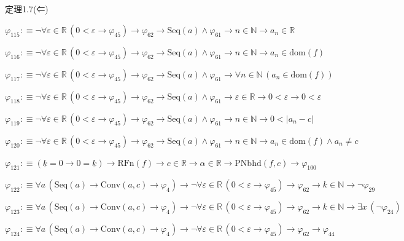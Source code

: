 \begin{fullproof}{定理1.7(⇐)}
\begin{abbrevlist}
\item $\varphi_{115} :\equiv \neg \forall \varepsilon \in \mathbb{R}\,(0 < \varepsilon \to \varphi_{45}) \to \varphi_{62} \to \mathrm{Seq}(a) \land \varphi_{61} \to n \in \mathbb{N} \to a_{n} \in \mathbb{R}$
\item $\varphi_{116} :\equiv \neg \forall \varepsilon \in \mathbb{R}\,(0 < \varepsilon \to \varphi_{45}) \to \varphi_{62} \to \mathrm{Seq}(a) \land \varphi_{61} \to n \in \mathbb{N} \to a_{n} \in \mathrm{dom}(f)$
\item $\varphi_{117} :\equiv \neg \forall \varepsilon \in \mathbb{R}\,(0 < \varepsilon \to \varphi_{45}) \to \varphi_{62} \to \mathrm{Seq}(a) \land \varphi_{61} \to \forall n \in \mathbb{N}\,(a_{n} \in \mathrm{dom}(f))$
\item $\varphi_{118} :\equiv \neg \forall \varepsilon \in \mathbb{R}\,(0 < \varepsilon \to \varphi_{45}) \to \varphi_{62} \to \mathrm{Seq}(a) \land \varphi_{61} \to \varepsilon \in \mathbb{R} \to 0 < \varepsilon \to 0 < \varepsilon$
\item $\varphi_{119} :\equiv \neg \forall \varepsilon \in \mathbb{R}\,(0 < \varepsilon \to \varphi_{45}) \to \varphi_{62} \to \mathrm{Seq}(a) \land \varphi_{61} \to n \in \mathbb{N} \to 0 < \lvert a_{n} - c \rvert$
\item $\varphi_{120} :\equiv \neg \forall \varepsilon \in \mathbb{R}\,(0 < \varepsilon \to \varphi_{45}) \to \varphi_{62} \to \mathrm{Seq}(a) \land \varphi_{61} \to n \in \mathbb{N} \to a_{n} \in \mathrm{dom}(f) \land a_{n} \neq c$
\item $\varphi_{121} :\equiv (\underline{k} = 0 \to 0 = \underline{k}) \to \mathrm{RFn}(f) \to c \in \mathbb{R} \to \alpha \in \mathbb{R} \to \mathrm{PNbhd}(f,c) \to \varphi_{100}$
\item $\varphi_{122} :\equiv \forall a\,(\mathrm{Seq}(a) \to \mathrm{Conv}(a,c) \to \varphi_{4}) \to \neg \forall \varepsilon \in \mathbb{R}\,(0 < \varepsilon \to \varphi_{45}) \to \varphi_{62} \to k \in \mathbb{N} \to \neg \varphi_{29}$
\item $\varphi_{123} :\equiv \forall a\,(\mathrm{Seq}(a) \to \mathrm{Conv}(a,c) \to \varphi_{4}) \to \neg \forall \varepsilon \in \mathbb{R}\,(0 < \varepsilon \to \varphi_{45}) \to \varphi_{62} \to k \in \mathbb{N} \to \exists x\,(\neg \varphi_{24})$
\item $\varphi_{124} :\equiv \forall a\,(\mathrm{Seq}(a) \to \mathrm{Conv}(a,c) \to \varphi_{4}) \to \neg \forall \varepsilon \in \mathbb{R}\,(0 < \varepsilon \to \varphi_{45}) \to \varphi_{62} \to \varphi_{44}$

\end{abbrevlist}
\end{fullproof}

